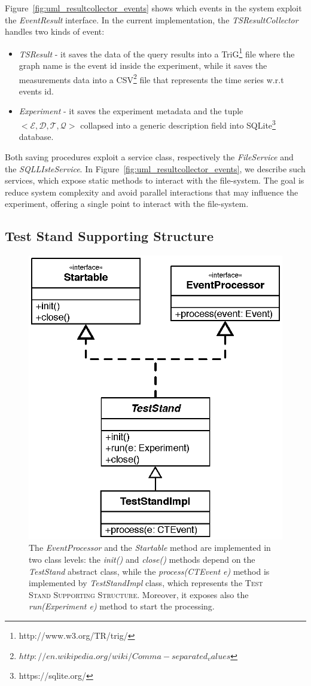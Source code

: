 \noindent Figure~\ref{fig:uml_resultcollector_events} shows which events in the system exploit the \textit{EventResult} interface. In the current implementation, the \textit{TSResultCollector} handles two kinds of event:
\begin{itemize}
\item \textit{TSResult} - it saves the data of the query results into a TriG\footnote{http://www.w3.org/TR/trig/} file where the graph name is the event id inside the experiment, while it saves the measurements data into a CSV\footnote{$http://en.wikipedia.org/wiki/Comma-separated_values$} file that represents the time series w.r.t events id. 
\item \textit{Experiment} - it saves the experiment metadata and the tuple \\ $<\mathcal{E},\mathcal{D},\mathcal{T},\mathcal{Q}>$ collapsed into a generic description field into SQLite\footnote{https://sqlite.org/} database.
\end{itemize} 

Both saving procedures exploit a service class, respectively the \textit{FileService} and the \textit{SQLLIsteService}. In Figure~\ref{fig:uml_resultcollector_events}, we describe such services, which expose static methods to interact with the file-system. The goal is reduce system complexity and avoid parallel interactions that may influence the experiment, offering a single point to interact with the file-system. 


\subsection{Test Stand Supporting Structure}\label{sec:teststand-impl}


\begin{figure}[tbh]
  \centering
	\includegraphics[width=0.5\linewidth]{images/uml_teststand}
	\caption[\name \textsc{TestStand} - UML Schema]{The \textit{EventProcessor} and the \textit{Startable} method are implemented in two class levels: the \textit{init()} and \textit{close()} methods depend on the \textit{TestStand} abstract class, while the  \textit{process(CTEvent e)} method is implemented by \textit{TestStandImpl} class, which represents the \textsc{Test Stand Supporting Structure}. Moreover, it exposes also the \textit{run(Experiment e)} method to start the processing.}
  	\label{fig:uml_teststand}
\end{figure}


